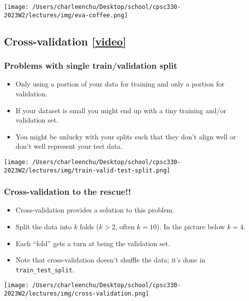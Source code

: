 \documentclass[11pt]{article}
\providecommand{\tightlist}{%
      \setlength{\itemsep}{0pt}\setlength{\parskip}{0pt}}
\begin{document}
\texttt{[image: /Users/charleenchu/Desktop/school/cpsc330-2023W2/lectures/img/eva-coffee.png]}

    \subsection{\texorpdfstring{Cross-validation
{[}\href{https://youtu.be/4cv8VYonepA}{video}{]}}{Cross-validation {[}video{]}}}\label{cross-validation-video}

    \subsubsection{Problems with single train/validation
split}\label{problems-with-single-trainvalidation-split}

\begin{itemize}
\tightlist
\item
  Only using a portion of your data for training and only a portion for
  validation.
\item
  If your dataset is small you might end up with a tiny training and/or
  validation set.
\item
  You might be unlucky with your splits such that they don't align well
  or don't well represent your test data.
\end{itemize}

\texttt{[image: /Users/charleenchu/Desktop/school/cpsc330-2023W2/lectures/img/train-valid-test-split.png]}

    \subsubsection{Cross-validation to the
rescue!!}\label{cross-validation-to-the-rescue}

\begin{itemize}
\tightlist
\item
  Cross-validation provides a solution to this problem.
\item
  Split the data into \(k\) folds (\(k>2\), often \(k=10\)). In the
  picture below \(k=4\).
\item
  Each ``fold'' gets a turn at being the validation set.
\item
  Note that cross-validation doesn't shuffle the data; it's done in
  \texttt{train\_test\_split}.
\end{itemize}

\texttt{[image: /Users/charleenchu/Desktop/school/cpsc330-2023W2/lectures/img/cross-validation.png]}
\end{document}
